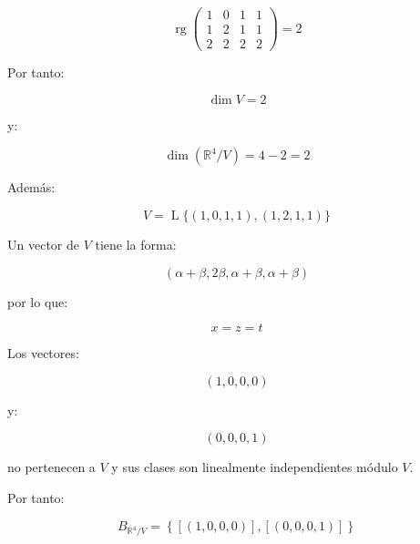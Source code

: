 \documentclass[11pt,a4paper]{article}
\newcommand{\R}{\mathbb{R}}
\newcommand{\Span}{\operatorname{L}}
\newcommand{\rg}{\operatorname{rg}}
\newcommand{\dimn}{\operatorname{dim}}
\begin{document}
	\[
	\rg
	\begin{pmatrix}
	1&0&1&1\\
	1&2&1&1\\
	2&2&2&2
	\end{pmatrix}
	=
	2
	\]

	Por tanto:

	\[
	\dimn V=2
	\]

	y:

	\[
	\dimn(\R^4/V)
	=
	4-2
	=
	2
	\]

	Además:

	\[
	V=
	\Span\{(1,0,1,1),(1,2,1,1)\}
	\]

	Un vector de $V$ tiene la forma:

	\[
	(\alpha+\beta,2\beta,\alpha+\beta,\alpha+\beta)
	\]

	por lo que:

	\[
	x=z=t
	\]

	Los vectores:

	\[
	(1,0,0,0)
	\]

	y:

	\[
	(0,0,0,1)
	\]

	no pertenecen a $V$ y sus clases son linealmente independientes módulo $V$.

	Por tanto:

	\[
	\boxed{
	B_{\R^4/V}
	=
	\left\{
	[(1,0,0,0)],
	[(0,0,0,1)]
	\right\}
	}
	\]
\end{document}
